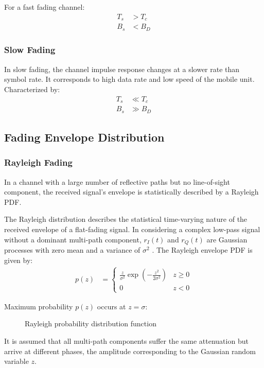 \noindent For a fast fading channel:
\begin{align*}
	T_s &> T_c \\
	B_s &< B_D
\end{align*}
\subsubsection{Slow Fading}
In slow fading, the channel impulse response changes at a slower rate than symbol rate. It corresponds to high data rate and low speed of the mobile unit. Characterized by:
\begin{align*}
	T_s &\ll T_c \\
	B_s &\gg B_D
\end{align*}

\subsection{Fading Envelope Distribution}
\subsubsection{Rayleigh Fading}
In a channel with a large number of reflective paths but no line-of-sight component, the received signal's envelope is statistically described by a Rayleigh \gls{PDF}\cite{AWGN}.

The Rayleigh distribution describes the statistical time-varying nature of the received envelope of a flat-fading signal\cite{4vn}. In considering a complex low-pass signal without a dominant multi-path component, \(r_I(t)\) and \(r_Q(t)\) are Gaussian processes with zero mean and a variance of \(\sigma^2\) \cite{fuqin}. The Rayleigh envelope \gls{PDF} is given by:
\begin{align*}
	p(z) &=
	\begin{cases}
		\frac{z}{\sigma^2} \exp \left( -\frac{z^2}{2\sigma^2} \right) & z \geq 0 \\
		0 & z < 0
	\end{cases}
\end{align*}
\begin{mathDef}
\end{mathDef}
Maximum probability \(p(z)\) occurs at \(z=\sigma\):
\begin{figure}[!ht]
	\centering
	\resizebox{0.8\textwidth}{!}{}
	\caption{Rayleigh probability distribution function}
\end{figure}
It is assumed that all multi-path components suffer the same attenuation but arrive at different phases, the amplitude corresponding to the Gaussian random variable \(z\)\cite{Hindu}.
